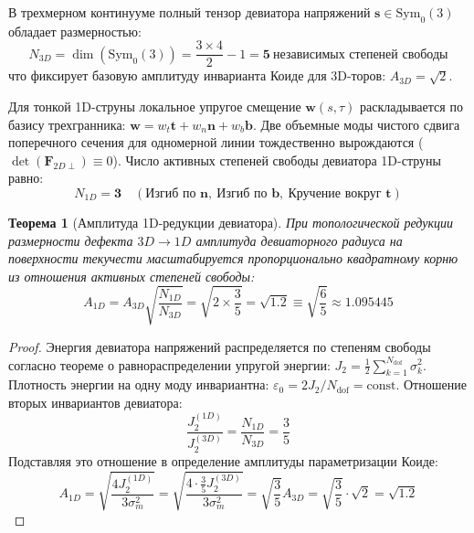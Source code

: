 \documentclass[12pt,a4paper]{article}
\newtheorem{theorem}{Теорема}
\begin{document}
	В трехмерном континууме полный тензор девиатора напряжений $\mathbf{s} \in \mathrm{Sym}_0(3)$ обладает размерностью:
	\begin{equation}
		N_{3D} = \dim(\mathrm{Sym}_0(3)) = \frac{3 \times 4}{2} - 1 = \mathbf{5} \ \text{независимых степеней свободы}
	\end{equation}
	что фиксирует базовую амплитуду инварианта Коиде для 3D-торов: $A_{3D} = \sqrt{2}$.
	
	Для тонкой 1D-струны локальное упругое смещение $\mathbf{w}(s, \tau)$ раскладывается по базису трехгранника: $\mathbf{w} = w_t \mathbf{t} + w_n \mathbf{n} + w_b \mathbf{b}$. Две объемные моды чистого сдвига поперечного сечения для одномерной линии тождественно вырождаются ($\det(\mathbf{F}_{2D \perp}) \equiv 0$). Число активных степеней свободы девиатора 1D-струны равно:
	\begin{equation}
		N_{1D} = \mathbf{3} \quad (\text{Изгиб по } \mathbf{n}, \ \text{Изгиб по } \mathbf{b}, \ \text{Кручение вокруг } \mathbf{t})
	\end{equation}
	
	\begin{theorem}[Амплитуда 1D-редукции девиатора]
		При топологической редукции размерности дефекта $3D \to 1D$ амплитуда девиаторного радиуса на поверхности текучести масштабируется пропорционально квадратному корню из отношения активных степеней свободы:
		\begin{equation}
			A_{1D} = A_{3D} \sqrt{\frac{N_{1D}}{N_{3D}}} = \sqrt{2 \times \frac{3}{5}} = \mathbf{\sqrt{1.2}} \equiv \sqrt{\frac{6}{5}} \approx 1.095445
		\end{equation}
	\end{theorem}
	
	\begin{proof}
		Энергия девиатора напряжений распределяется по степеням свободы согласно теореме о равнораспределении упругой энергии: $J_2 = \frac{1}{2}\sum_{k=1}^{N_{\text{dof}}} \sigma_k^2$. Плотность энергии на одну моду инвариантна: $\varepsilon_0 = 2 J_2 / N_{\text{dof}} = \mathrm{const}$. Отношение вторых инвариантов девиатора:
		\begin{equation}
			\frac{J_2^{(1D)}}{J_2^{(3D)}} = \frac{N_{1D}}{N_{3D}} = \frac{3}{5}
		\end{equation}
		Подставляя это отношение в определение амплитуды параметризации Коиде:
		\begin{equation}
			A_{1D} = \sqrt{\frac{4 J_2^{(1D)}}{3 \sigma_m^2}} = \sqrt{\frac{4 \cdot \frac{3}{5} J_2^{(3D)}}{3 \sigma_m^2}} = \sqrt{\frac{3}{5}} A_{3D} = \sqrt{\frac{3}{5}} \cdot \sqrt{2} = \mathbf{\sqrt{1.2}}
		\end{equation}
	\end{proof}
	
\end{document}
